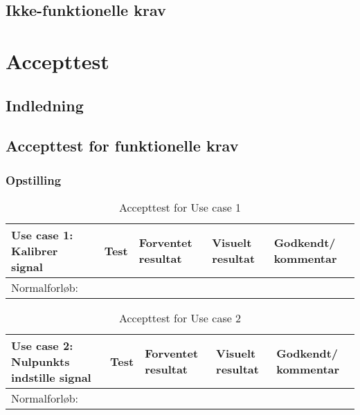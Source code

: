 \section{Ikke-funktionelle krav}

\chapter{Accepttest}
\section{Indledning}
\section{Accepttest for funktionelle krav}

\subsection{Opstilling}

\begin{table}[h!]
\caption{Accepttest for Use case 1}\label{tab:tabel8}
\begin{tabular}{|>{\raggedright\arraybackslash}p{2.5cm}| >{\raggedright\arraybackslash}p{2.9cm} | >{\raggedright\arraybackslash}p{2.9cm} | >{\raggedright\arraybackslash}p{2.9cm} | >{\raggedright\arraybackslash}p{2.8cm} |}
   \hline
   \textbf{Use case 1: Kalibrer signal} &\textbf{Test}& \textbf{Forventet resultat} & \textbf{Visuelt resultat} & \textbf{Godkendt/ kommentar}\\ \hline
   Normalforløb:& & & &\\\hline
\end{tabular}
\end{table}

\begin{table}[h!]
\caption{Accepttest for Use case 2}\label{tab:tabel8}
\begin{tabular}{|>{\raggedright\arraybackslash}p{2.5cm}| >{\raggedright\arraybackslash}p{2.9cm} | >{\raggedright\arraybackslash}p{2.9cm} | >{\raggedright\arraybackslash}p{2.9cm} | >{\raggedright\arraybackslash}p{2.8cm} |}
   \hline
   \textbf{Use case 2: Nulpunkts indstille signal } &\textbf{Test}& \textbf{Forventet resultat} & \textbf{Visuelt resultat} & \textbf{Godkendt/ kommentar}\\ \hline
   Normalforløb:& & & &\\\hline
\end{tabular}
\end{table}

